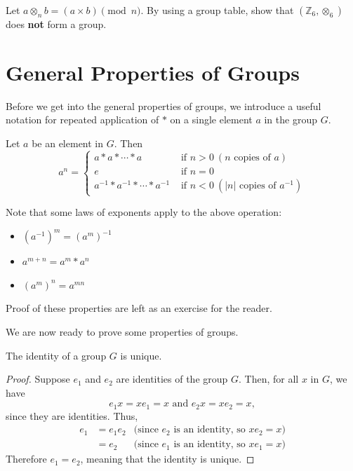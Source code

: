 \begin{exercise}
    Let $a \otimes_n b = (a \times b) \pmod{n}$. By using a group table, show that $(\mathbb{Z}_6, \otimes_6)$ does \textbf{not} form a group.
\end{exercise}

\newpage

\section{General Properties of Groups}
Before we get into the general properties of groups, we introduce a useful notation for repeated application of $\ast$ on a single element $a$ in the group $G$.
\begin{definition}
    Let $a$ be an element in $G$. Then
    \[
        a^n =
        \begin{cases}
        a\ast a\ast \cdots \ast a & \text{ if } n > 0 \ (n\text{ copies of }a)\\
        e & \text{ if } n=0 \\
        a^{-1}\ast a^{-1}\ast\cdots \ast a^{-1} & \text{ if } n<0 \ (|n|\text{ copies of }a^{-1})
        \end{cases}
    \]
\end{definition}

Note that some laws of exponents apply to the above operation:
\begin{itemize}
    \item $\left(a^{-1}\right)^m = \left(a^m\right)^{-1}$
    \item $a^{m+n} = a^m \ast a^n$
    \item $\left(a^m\right)^n = a^{mn}$
\end{itemize}
Proof of these properties are left as an exercise for the reader.

We are now ready to prove some properties of groups.
\begin{proposition}
    The identity of a group $G$ is unique.
\end{proposition}
\begin{proof}
    Suppose $e_1$ and $e_2$ are identities of the group $G$. Then, for all $x$ in $G$, we have
    \[
        e_1x = xe_1 = x \text{ and } e_2x = xe_2 = x,
    \]
    since they are identities. Thus,
    \begin{align*}
        e_1 &= e_1e_2 & \text{(since } e_2 \text{ is an identity, so } xe_2 = x \text{)}\\
        &= e_2 & \text{(since } e_1 \text{ is an identity, so } xe_1 = x \text{)}
    \end{align*}
    Therefore $e_1 = e_2$, meaning that the identity is unique.
\end{proof}


